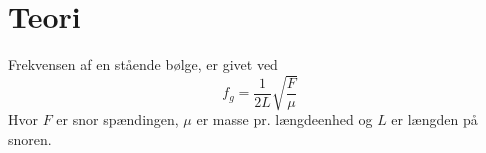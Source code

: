 \section{Teori}
Frekvensen af en stående bølge, er givet ved
\begin{equation}
 f_g = \frac{1}{2L}\sqrt{\frac{F}{\mu}}
\end{equation}
Hvor $F$ er snor spændingen, $\mu$ er masse pr. længdeenhed og $L$ er længden på snoren.
